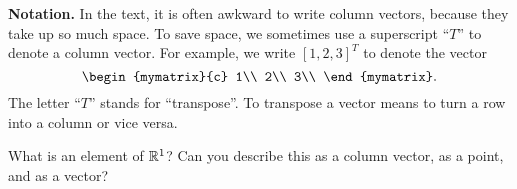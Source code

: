 \noindent\textbf{Notation.}
In the text, it is often awkward to write column vectors, because they
take up so much space. To save space, we sometimes use a superscript
``$T$'' to denote a column vector. For example, we write $[1, 2, 3]^T$
to denote the vector
\begin{equation*}
  \begin{mymatrix}{c}
    1\\
    2\\
    3\\
  \end{mymatrix}.
\end{equation*}
The letter ``$T$'' stands for ``transpose''. To transpose a vector
means to turn a row into a column or vice versa.


\begin{ex}
  What is an element of $\mathbb{R}^1$? Can you describe this as a column
  vector, as a point, and as a vector?
\end{ex}
